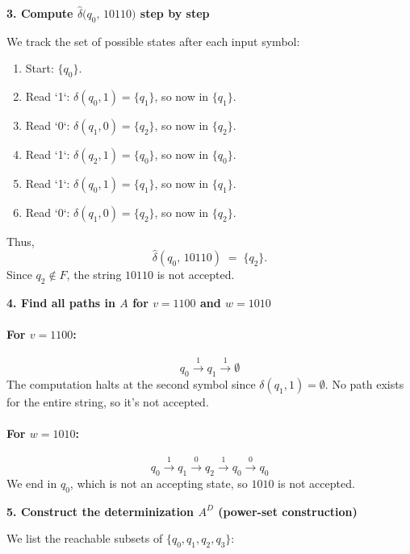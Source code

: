\documentclass{article}
\theoremstyle{theorem}
\theoremstyle{definition}
\theoremstyle{remark}
\begin{document}
\textbf{3. Compute $\hat{\delta}\bigl(q_0,\,10110\bigr)$ step by step}

We track the set of possible states after each input symbol:

\begin{enumerate}
\item Start: $\{q_0\}$.
\item Read `1`: $\delta(q_0,1) = \{q_1\}$, so now in $\{q_1\}$.
\item Read `0`: $\delta(q_1,0) = \{q_2\}$, so now in $\{q_2\}$.
\item Read `1`: $\delta(q_2,1) = \{q_0\}$, so now in $\{q_0\}$.
\item Read `1`: $\delta(q_0,1) = \{q_1\}$, so now in $\{q_1\}$.
\item Read `0`: $\delta(q_1,0) = \{q_2\}$, so now in $\{q_2\}$.
\end{enumerate}

Thus,
\[
\hat{\delta}(q_0,\,10110) \;=\; \{q_2\}.
\]
Since $q_2 \notin F$, the string $10110$ is not accepted.

\textbf{4. Find all paths in $A$ for $v = 1100$ and $w = 1010$}

\paragraph{For $v = 1100$:}
\[
q_0 \xrightarrow{\,1\,} q_1 \xrightarrow{\,1\,} \emptyset
\]
The computation halts at the second symbol since $\delta(q_1,1) = \emptyset$. No path exists for the entire string, so it's not accepted.

\paragraph{For $w = 1010$:}
\[
q_0 \xrightarrow{\,1\,} q_1 
\xrightarrow{\,0\,} q_2 
\xrightarrow{\,1\,} q_0 
\xrightarrow{\,0\,} q_0
\]
We end in $q_0$, which is not an accepting state, so $1010$ is not accepted.

\textbf{5. Construct the determinization $A^D$ (power-set construction)}

We list the reachable subsets of $\{q_0, q_1, q_2, q_3\}$:
\end{document}
